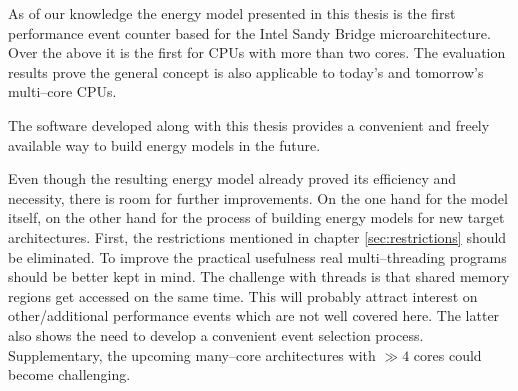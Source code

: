 
As of our knowledge the energy model presented in this thesis is the first
performance event counter based for the Intel\TReg{} Sandy Bridge
microarchitecture. Over the above it is the first for CPUs with more than two
cores. The evaluation results prove the general concept is also applicable to
today's and tomorrow's multi--core CPUs.

The software developed along with this thesis provides a convenient and freely
available way to build energy models in the future.


\label{sec:problems}

Even though the resulting energy model already proved its efficiency and
necessity, there is room for further improvements. On the one hand for the model
itself, on the other hand for the process of building energy models for new
target architectures. First, the restrictions mentioned in chapter
\ref{sec:restrictions} should be eliminated. To improve the practical usefulness
real multi--threading programs should be better kept in mind. The challenge with
threads is that shared memory regions get accessed on the same time. This will
probably attract interest on other/additional performance events which are not
well covered here. The latter also shows the need to develop a convenient event
selection process. Supplementary, the upcoming many--core architectures with
$\gg 4$ cores could become challenging.

